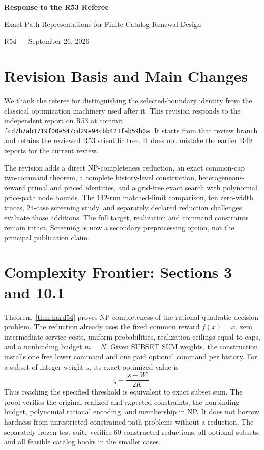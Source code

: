 \begin{center}{\Large\bfseries Response to the R53 Referee}\par\vspace{6pt}
Exact Path Representations for Finite-Catalog Renewal Design\par
R54 --- September 26, 2026\end{center}

\section*{Revision Basis and Main Changes}
We thank the referee for distinguishing the selected-boundary identity from the classical optimization machinery used after it. This revision responds to the independent report on R53 at commit \texttt{fcd7b7ab1719f00e547cd29e94cbb421fab59b0a}. It starts from that review branch and retains the reviewed R53 scientific tree. It does not mistake the earlier R49 reports for the current review.

The revision adds a direct NP-completeness reduction, an exact common-cap two-command theorem, a complete history-level construction, heterogeneous-reward primal and priced identities, and a grid-free exact search with polynomial price-path node bounds. The 142-run matched-limit comparison, ten zero-width traces, 24-case screening study, and separately declared reduction challenges evaluate those additions. The full target, realization and command constraints remain intact. Screening is now a secondary preprocessing option, not the principal publication claim.

\section{Complexity Frontier: Sections 3 and 10.1}
Theorem~\ref{thm:hard54} proves NP-completeness of the rational quadratic decision problem. The reduction already uses the fixed common reward $f(x)=x$, zero intermediate-service costs, uniform probabilities, realization ceilings equal to caps, and a nonbinding budget $m=N$. Given SUBSET SUM weights, the construction installs one free lower command and one paid optional command per history. For a subset of integer weight $s$, its exact optimized value is
\[
 \zeta-\frac{|s-W|}{2K}.
\]
Thus reaching the specified threshold is equivalent to exact subset sum. The proof verifies the original realized and expected constraints, the nonbinding budget, polynomial rational encoding, and membership in NP. It does not borrow hardness from unrestricted constrained-path problems without a reduction. The separately frozen test suite verifies 60 constructed reductions, all \HardnessSubsets{} optional subsets, and all \HardnessBooks{} feasible catalog books in the smaller cases.

